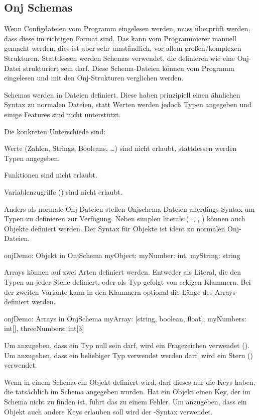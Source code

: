 
\subsection{Onj Schemas}\label{subsec:onj-schemas}

\renewcommand{\kapitelautor}{Autor: Marvin Kurka}

Wenn Configdateien vom Programm eingelesen werden, muss überprüft werden, dass diese im richtigen Format sind.
Das kann vom Programmierer manuell gemacht werden, dies ist aber sehr umständlich, vor allem großen/komplexen Strukturen.
Stattdessen werden Schemas verwendet, die definieren wie eine Onj-Datei strukturiert sein darf.
Diese Schema-Dateien können vom Programm eingelesen und mit den Onj-Strukturen verglichen werden.

Schemas werden in  Dateien definiert.
Diese haben prinzipiell einen ähnlichen Syntax zu normalen  Dateien, statt Werten werden jedoch
Typen angegeben und einige Features sind nicht unterstützt.

Die konkreten Unterschiede sind:
\begin{liste}
    \item Werte (\zB Zahlen, Strings, Booleans, \ldots) sind nicht erlaubt, stattdessen werden Typen angegeben.
    \item Funktionen sind nicht erlaubt.
    \item Variablenzugriffe () sind nicht erlaubt.
\end{liste}

Anders als normale Onj-Dateien stellen Onjschema-Dateien allerdings Syntax um Typen zu definieren zur Verfügung.
Neben simplen literals (, , , ) können auch
Objekte definiert werden.
Der Syntax für Objekte ist ident zu normalen Onj-Dateien.

\begin{codeBlock}{onj}{Demo: Objekt in OnjSchema}
myObject: {
    myNumber: int,
    myString: string
}
\end{codeBlock}

Arrays können auf zwei Arten definiert werden.
Entweder als Literal, die den Typen an jeder Stelle definiert, oder als Typ gefolgt von eckigen Klammern.
Bei der zweiten Variante kann in den Klammern optional die Länge des Arrays definiert werden.

\begin{codeBlock}{onj}{Demo: Arrays in OnjSchema}
myArray: [string, boolean, float],
myNumbers: int[],
threeNumbers: int[3]
\end{codeBlock}

Um anzugeben, dass ein Typ null sein darf, wird ein Fragezeichen verwendet ().
Um anzugeben, dass ein beliebiger Typ verwendet werden darf, wird ein Stern (\inlineOnj{*}) verwendet.

Wenn in einem Schema ein Objekt definiert wird, darf dieses nur die Keys haben, die tatsächlich im Schema angegeben
wurden.
Hat ein Objekt einen Key, der im Schema nicht zu finden ist, führt das zu einem Fehler.
Um anzugeben, dass ein Objekt auch andere Keys erlauben soll wird der -Syntax verwendet.

\renewcommand{\kapitelautor}{}

